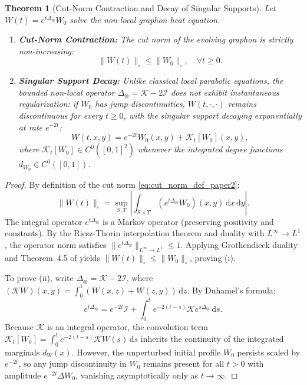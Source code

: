 \documentclass[11pt,a4paper,reqno]{amsart}
\newtheorem{theorem}{Theorem}[section]
\theoremstyle{definition}
\numberwithin{equation}{section}
\providecommand{\cutnorm}[1]{\|#1\|_{\square}}
\newcommand{\dif}{\,\mathrm{d}}
\providecommand{\cutnorm}[1]{\|#1\|_{\square}}
\begin{document}
\begin{theorem}[Cut-Norm Contraction and Decay of Singular Supports]
\label{thm:heat_smoothing}
Let $W(t) = e^{t \Delta_\otimes} W_0$ solve the non-local graphon heat equation.
\begin{enumerate}[label=(\roman*)]
    \item \textbf{Cut-Norm Contraction:} The cut norm of the evolving graphon is strictly non-increasing:
    \begin{equation}
        \cutnorm{W(t)} \le \cutnorm{W_0}, \quad \forall t \ge 0.
    \end{equation}
    \item \textbf{Singular Support Decay:} Unlike classical local parabolic equations, the bounded non-local operator $\Delta_\otimes = \mathcal{K} - 2\mathcal{I}$ does not exhibit instantaneous regularization: if $W_0$ has jump discontinuities, $W(t, \cdot, \cdot)$ remains discontinuous for every $t \ge 0$, with the singular support decaying exponentially at rate $e^{-2t}$:
    \begin{equation}
        W(t, x, y) = e^{-2t} W_0(x, y) + \mathcal{K}_t[W_0](x, y),
    \end{equation}
    where $\mathcal{K}_t[W_0] \in C^0([0, 1]^2)$ whenever the integrated degree functions $d_{W_0} \in C^0([0, 1])$.
\end{enumerate}
\end{theorem}
\begin{proof}
By definition of the cut norm \eqref{eq:cut_norm_def_paper2}:
\begin{equation}
    \cutnorm{W(t)} = \sup_{S, T} \left| \int_{S \times T} (e^{t \Delta_\otimes} W_0)(x, y) \dif x \dif y \right|.
\end{equation}
The integral operator $e^{t \Delta_\otimes}$ is a Markov operator (preserving positivity and constants). By the Riesz-Thorin interpolation theorem and duality with $L^\infty \to L^1$, the operator norm satisfies $\|e^{t \Delta_\otimes}\|_{L^\infty \to L^1} \le 1$. Applying Grothendieck duality and Theorem~4.5 of \cite{silvafilho2026functional} yields $\cutnorm{W(t)} \le \cutnorm{W_0}$, proving (i).

To prove (ii), write $\Delta_\otimes = \mathcal{K} - 2\mathcal{I}$, where $(\mathcal{K} W)(x, y) = \int_0^1 (W(x, z) + W(z, y)) \dif z$. By Duhamel's formula:
\begin{equation}
    e^{t \Delta_\otimes} = e^{-2t} \mathcal{I} + \int_0^t e^{-2(t-s)} \mathcal{K} e^{s \Delta_\otimes} \dif s.
\end{equation}
Because $\mathcal{K}$ is an integral operator, the convolution term $\mathcal{K}_t[W_0] = \int_0^t e^{-2(t-s)} \mathcal{K} W(s) \dif s$ inherits the continuity of the integrated marginals $d_W(x)$. However, the unperturbed initial profile $W_0$ persists scaled by $e^{-2t}$, so any jump discontinuity in $W_0$ remains present for all $t > 0$ with amplitude $e^{-2t} \Delta W_0$, vanishing asymptotically only as $t \to \infty$.
\end{proof}
\end{document}

